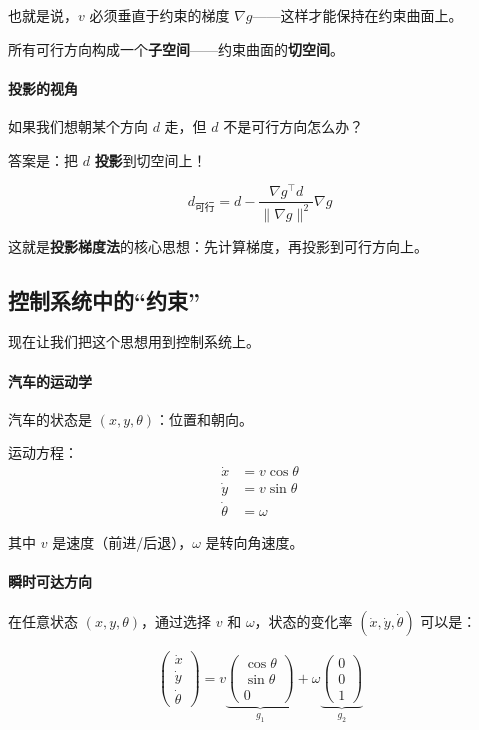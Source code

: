 也就是说，$v$ 必须垂直于约束的梯度 $\nabla g$——这样才能保持在约束曲面上。

所有可行方向构成一个\textbf{子空间}——约束曲面的\textbf{切空间}。

\paragraph{投影的视角}

如果我们想朝某个方向 $d$ 走，但 $d$ 不是可行方向怎么办？

答案是：把 $d$ \textbf{投影}到切空间上！

\begin{equation}
d_{\text{可行}} = d - \frac{\nabla g^\top d}{\|\nabla g\|^2} \nabla g
\end{equation}

这就是\textbf{投影梯度法}的核心思想：先计算梯度，再投影到可行方向上。

\subsection*{控制系统中的“约束”}

现在让我们把这个思想用到控制系统上。

\paragraph{汽车的运动学}

汽车的状态是 $(x, y, \theta)$：位置和朝向。

运动方程：
\begin{align}
\dot{x} &= v \cos\theta \\
\dot{y} &= v \sin\theta \\
\dot{\theta} &= \omega
\end{align}

其中 $v$ 是速度（前进/后退），$\omega$ 是转向角速度。

\paragraph{瞬时可达方向}

在任意状态 $(x, y, \theta)$，通过选择 $v$ 和 $\omega$，状态的变化率 $(\dot{x}, \dot{y}, \dot{\theta})$ 可以是：

\begin{equation}
\begin{pmatrix} \dot{x} \\ \dot{y} \\ \dot{\theta} \end{pmatrix} = 
v \underbrace{\begin{pmatrix} \cos\theta \\ \sin\theta \\ 0 \end{pmatrix}}_{g_1} + 
\omega \underbrace{\begin{pmatrix} 0 \\ 0 \\ 1 \end{pmatrix}}_{g_2}
\end{equation}

